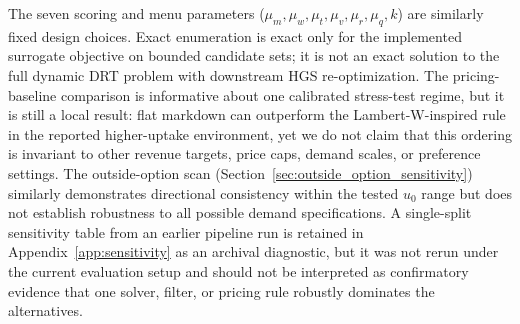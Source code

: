 The seven scoring and menu parameters ($\mu_m, \mu_w, \mu_t, \mu_v, \mu_r, \mu_q, k$) are similarly fixed design choices. Exact enumeration is exact only for the implemented surrogate objective on bounded candidate sets; it is not an exact solution to the full dynamic DRT problem with downstream HGS re-optimization. The pricing-baseline comparison is informative about one calibrated stress-test regime, but it is still a local result: flat markdown can outperform the Lambert-W-inspired rule in the reported higher-uptake environment, yet we do not claim that this ordering is invariant to other revenue targets, price caps, demand scales, or preference settings. The outside-option scan (Section~\ref{sec:outside_option_sensitivity}) similarly demonstrates directional consistency within the tested $u_0$ range but does not establish robustness to all possible demand specifications. A single-split sensitivity table from an earlier pipeline run is retained in Appendix~\ref{app:sensitivity} as an archival diagnostic, but it was not rerun under the current evaluation setup and should not be interpreted as confirmatory evidence that one solver, filter, or pricing rule robustly dominates the alternatives.

